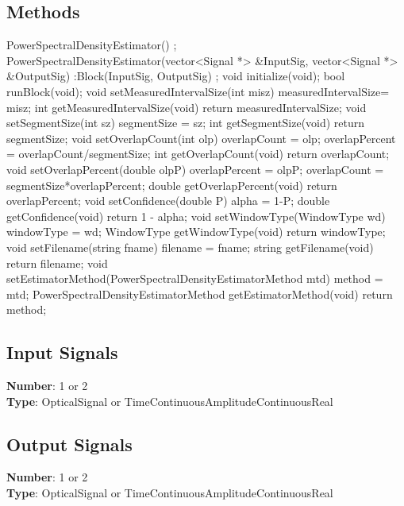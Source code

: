 \begin{refsection}
\subsection*{Methods}
	PowerSpectralDensityEstimator() {};
	\bigbreak
	PowerSpectralDensityEstimator(vector<Signal *> \&InputSig, vector<Signal *> \&OutputSig) :Block(InputSig, OutputSig) {};
	\bigbreak
	void initialize(void);
	\bigbreak
	bool runBlock(void);
	\bigbreak
	void setMeasuredIntervalSize(int misz) { measuredIntervalSize= misz; }
	\bigbreak
	int getMeasuredIntervalSize(void) { return measuredIntervalSize; }
	\bigbreak
	void setSegmentSize(int sz) { segmentSize = sz; }
	\bigbreak
	int getSegmentSize(void) { return segmentSize; }
	\bigbreak
	void setOverlapCount(int olp) { overlapCount = olp; overlapPercent =  overlapCount/segmentSize;}
	\bigbreak
	int getOverlapCount(void) { return overlapCount; }
	\bigbreak
	void setOverlapPercent(double olpP) { overlapPercent = olpP; overlapCount = segmentSize*overlapPercent;}
	\bigbreak
	double getOverlapPercent(void) { return overlapPercent; }
	\bigbreak
	void setConfidence(double P) { alpha = 1-P; }
	\bigbreak
	double getConfidence(void) { return 1 - alpha; }
	\bigbreak
	void setWindowType(WindowType wd) { windowType = wd; }
	\bigbreak
	WindowType getWindowType(void) { return windowType; }
	\bigbreak
	void setFilename(string fname) { filename = fname; }
	\bigbreak
	string getFilename(void) { return filename; }
	\bigbreak
	void setEstimatorMethod(PowerSpectralDensityEstimatorMethod mtd) { method = mtd; }
	\bigbreak
	PowerSpectralDensityEstimatorMethod getEstimatorMethod(void) { return method; }
	\bigbreak

\subsection*{Input Signals}

\textbf{Number}: 1 or 2\\
\textbf{Type}: OpticalSignal or TimeContinuousAmplitudeContinuousReal

\subsection*{Output Signals}

\textbf{Number}: 1 or 2\\
\textbf{Type}: OpticalSignal or TimeContinuousAmplitudeContinuousReal


\end{refsection}
